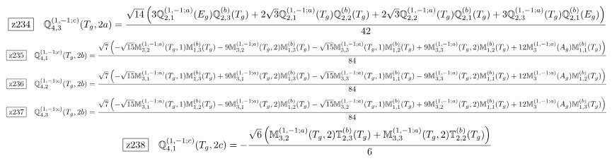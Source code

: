 \documentclass[fleqn,10pt,landscape]{jsarticle}
\begin{document}
\begin{dmath*}
\hspace*{3mm}\fbox{z234}\quad \mathbb{Q}_{4,3}^{(1,-1;c)}(T_{g},2a)=\frac{\sqrt{14} \left(3 \mathbb{Q}_{2,1}^{(1,-1;a)}(E_{g}) \mathbb{Q}_{2,3}^{(b)}(T_{g}) + 2 \sqrt{3} \mathbb{Q}_{2,1}^{(1,-1;a)}(T_{g}) \mathbb{Q}_{2,2}^{(b)}(T_{g}) + 2 \sqrt{3} \mathbb{Q}_{2,2}^{(1,-1;a)}(T_{g}) \mathbb{Q}_{2,1}^{(b)}(T_{g}) + 3 \mathbb{Q}_{2,3}^{(1,-1;a)}(T_{g}) \mathbb{Q}_{2,1}^{(b)}(E_{g})\right)}{42}
\end{dmath*}
\begin{dmath*}
\hspace*{3mm}\fbox{z235}\quad \mathbb{Q}_{4,1}^{(1,-1;c)}(T_{g},2b)=\frac{\sqrt{7} \left(- \sqrt{15} \mathbb{M}_{3,2}^{(1,-1;a)}(T_{g},1) \mathbb{M}_{1,3}^{(b)}(T_{g}) - 9 \mathbb{M}_{3,2}^{(1,-1;a)}(T_{g},2) \mathbb{M}_{1,3}^{(b)}(T_{g}) - \sqrt{15} \mathbb{M}_{3,3}^{(1,-1;a)}(T_{g},1) \mathbb{M}_{1,2}^{(b)}(T_{g}) + 9 \mathbb{M}_{3,3}^{(1,-1;a)}(T_{g},2) \mathbb{M}_{1,2}^{(b)}(T_{g}) + 12 \mathbb{M}_{3}^{(1,-1;a)}(A_{g}) \mathbb{M}_{1,1}^{(b)}(T_{g})\right)}{84}
\end{dmath*}
\begin{dmath*}
\hspace*{3mm}\fbox{z236}\quad \mathbb{Q}_{4,2}^{(1,-1;c)}(T_{g},2b)=\frac{\sqrt{7} \left(- \sqrt{15} \mathbb{M}_{3,1}^{(1,-1;a)}(T_{g},1) \mathbb{M}_{1,3}^{(b)}(T_{g}) + 9 \mathbb{M}_{3,1}^{(1,-1;a)}(T_{g},2) \mathbb{M}_{1,3}^{(b)}(T_{g}) - \sqrt{15} \mathbb{M}_{3,3}^{(1,-1;a)}(T_{g},1) \mathbb{M}_{1,1}^{(b)}(T_{g}) - 9 \mathbb{M}_{3,3}^{(1,-1;a)}(T_{g},2) \mathbb{M}_{1,1}^{(b)}(T_{g}) + 12 \mathbb{M}_{3}^{(1,-1;a)}(A_{g}) \mathbb{M}_{1,2}^{(b)}(T_{g})\right)}{84}
\end{dmath*}
\begin{dmath*}
\hspace*{3mm}\fbox{z237}\quad \mathbb{Q}_{4,3}^{(1,-1;c)}(T_{g},2b)=\frac{\sqrt{7} \left(- \sqrt{15} \mathbb{M}_{3,1}^{(1,-1;a)}(T_{g},1) \mathbb{M}_{1,2}^{(b)}(T_{g}) - 9 \mathbb{M}_{3,1}^{(1,-1;a)}(T_{g},2) \mathbb{M}_{1,2}^{(b)}(T_{g}) - \sqrt{15} \mathbb{M}_{3,2}^{(1,-1;a)}(T_{g},1) \mathbb{M}_{1,1}^{(b)}(T_{g}) + 9 \mathbb{M}_{3,2}^{(1,-1;a)}(T_{g},2) \mathbb{M}_{1,1}^{(b)}(T_{g}) + 12 \mathbb{M}_{3}^{(1,-1;a)}(A_{g}) \mathbb{M}_{1,3}^{(b)}(T_{g})\right)}{84}
\end{dmath*}
\begin{dmath*}
\hspace*{3mm}\fbox{z238}\quad \mathbb{Q}_{4,1}^{(1,-1;c)}(T_{g},2c)=- \frac{\sqrt{6} \left(\mathbb{M}_{3,2}^{(1,-1;a)}(T_{g},2) \mathbb{T}_{2,3}^{(b)}(T_{g}) + \mathbb{M}_{3,3}^{(1,-1;a)}(T_{g},2) \mathbb{T}_{2,2}^{(b)}(T_{g})\right)}{6}
\end{dmath*}
\end{document}
